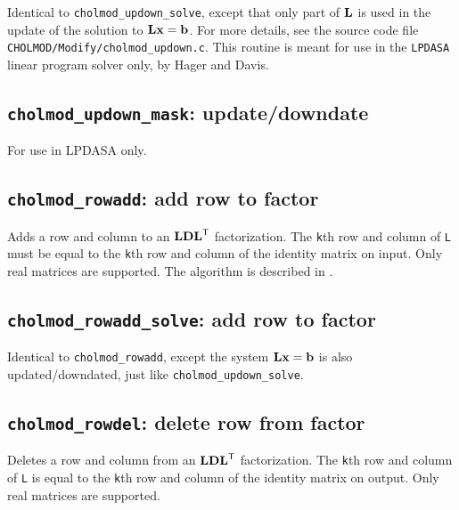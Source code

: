 \documentclass[11pt]{article}
\newcommand{\m}[1]{{\bf{#1}}}       %
\newcommand{\tr}{^{\sf T}}          %
\begin{document}

Identical to {\tt cholmod\_updown\_solve}, except that only part of $\m{L}$
is used in the update of the solution to $\m{Lx}=\m{b}$.  For more details,
see the source code file {\tt CHOLMOD/Modify/cholmod\_updown.c}.
This routine is meant for use in the {\tt LPDASA} linear program solver only,
by Hager and Davis.

\subsection{{\tt cholmod\_updown\_mask}: update/downdate}


For use in LPDASA only.

\subsection{{\tt cholmod\_rowadd}: add row to factor}


Adds a row and column to an $\m{LDL}\tr$ factorization.  The {\tt k}th
row and column of {\tt L} must be equal to the {\tt k}th row and
column of the identity matrix on input.
Only real matrices are supported.
The algorithm is described in \cite{DavisHager05}.

\subsection{{\tt cholmod\_rowadd\_solve}: add row to factor}


Identical to {\tt cholmod\_rowadd}, except the system $\m{Lx}=\m{b}$ is also updated/downdated, just like {\tt cholmod\_updown\_solve}.

\subsection{{\tt cholmod\_rowdel}: delete row from factor}


Deletes a row and column from an $\m{LDL}\tr$ factorization.  The {\tt k}th
row and column of {\tt L} is equal to the {\tt k}th row and
column of the identity matrix on output.
Only real matrices are supported.
\end{document}
